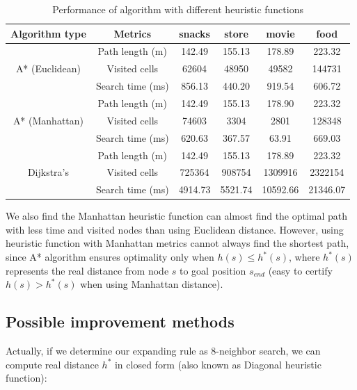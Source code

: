 \documentclass[hyperref]{article}
\theoremstyle{nonumberplain}
\begin{document}
\begin{table}[H]
	\centering
	\begin{minipage}[c]{0.8\textwidth}
		\centering
		\caption{Performance of algorithm with different heuristic functions}
		\begin{tabular}{|c|c|c|c|c|c|}
			\hline
			Algorithm type &Metrics  &snacks &store &movie &food \\
			\hline
			&Path length (m) &142.49 &155.13 &178.89 &223.32 \\
			A* (Euclidean)&Visited cells &62604 &48950 &49582 &144731\\
			& Search time (ms) &856.13 &440.20 &919.54 &606.72 \\ 
			\hline
			&Path length (m) &142.49 &155.13 &178.90 &223.32 \\
			A* (Manhattan)&Visited cells &74603 &3304 &2801 &128348\\
			& Search time (ms) &620.63 &367.57 &63.91 &669.03 \\ 
			\hline
			&Path length (m) &142.49 &155.13 &178.89 &223.32 \\
			Dijkstra's&Visited cells &725364 &908754 &1309916 &2322154\\
			& Search time (ms) &4914.73 &5521.74 &10592.66 &21346.07 \\ 
			\hline
		\end{tabular}
		\label{tab4}
	\end{minipage}
\end{table}

We also find the Manhattan heuristic function can almost find the optimal path with less time and visited nodes than using Euclidean distance. However, using heuristic function with Manhattan metrics cannot always find the shortest path, since A* algorithm ensures optimality only when $h(s) \leq h^{*}(s)$, where $h^{*}(s)$ represents the real distance from node $s$ to goal position $s_{end}$ (easy to certify $h(s) > h^{*}(s)$ when using Manhattan distance). 



\subsection{Possible improvement methods}
\hspace{1.0em}

Actually, if we determine our expanding rule as 8-neighbor search, we can compute real distance $h^{*}$ in closed form (also known as Diagonal heuristic function):
\end{document}
